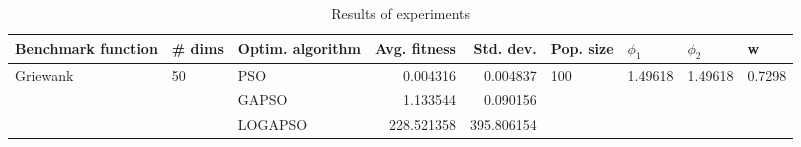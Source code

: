 \begin{table}
\centering
\caption{Results of experiments}
\begin{tabular}{lllrrllll}
\toprule
       Benchmark function &             \# dims & Optim. algorithm &  Avg. fitness &  Std. dev. &            Pop. size &               $\phi_{1}$ &               $\phi_{2}$ &                       w \\
\midrule
\multirow{3}{*}{Griewank} & \multirow{3}{*}{50} &              PSO &      0.004316 &   0.004837 & \multirow{3}{*}{100} & \multirow{3}{*}{1.49618} & \multirow{3}{*}{1.49618} & \multirow{3}{*}{0.7298} \\
                          &                     &            GAPSO &      1.133544 &   0.090156 &                      &                          &                          &                         \\
                          &                     &          LOGAPSO &    228.521358 & 395.806154 &                      &                          &                          &                         \\
\bottomrule
\end{tabular}
\end{table}
